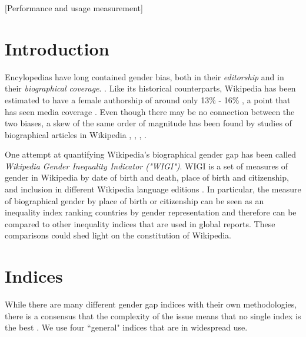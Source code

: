 \documentclass{sig-alternate}
\begin{document}
[Performance and usage measurement]



\section{Introduction}
Encylopedias have long contained gender bias, both in their \textit{editorship} and in their \textit{biographical coverage}. \cite{thomas:respect} \cite{reagle}. Like its historical counterparts, Wikipedia has been estimated to have a female authorship of around only 13\% - 16\% \cite{ghosh} \cite{hill}, a point that has seen media coverage \cite{eckert}. Even though there may be no connection between the two biases, a skew of the same order of magnitude has been found by studies of biographical articles in Wikipedia \cite{lam}, \cite{eom}, \cite{reagle}, \cite{klein:blog}.

One attempt at quantifying Wikipedia's biographical gender gap has been called \textit{Wikipedia Gender Inequality Indicator ("WIGI")}. WIGI is a set of measures of gender in Wikipedia by date of birth and death, place of birth and citizenship, and inclusion in different Wikipedia language editions \cite{klein:wigi}. In particular,  the measure of biographical gender by place of birth or citizenship can be seen as an inequality index ranking countries by gender representation and therefore can be compared to other inequality indices that are used in global reports. These comparisons could shed light on the constitution of Wikipedia.

\section{Indices}

While there are many different gender gap indices with their own methodologies, there is a consensus that the complexity of the issue means that no single index is the best \cite{mills} \cite{hawken} \cite{beneria}. We use four ``general" indices that are in widespread use. 
\end{document}
